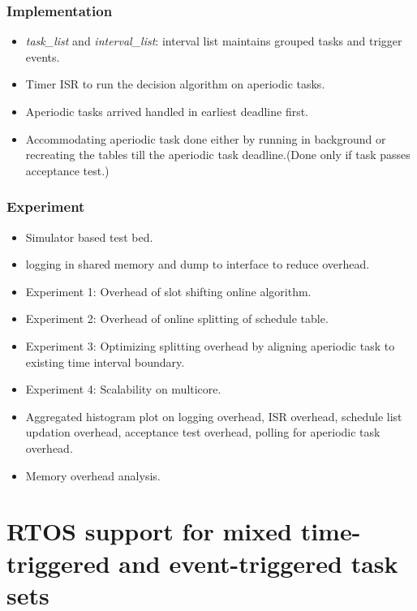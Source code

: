 \subsubsection*{Implementation}
\begin{itemize}
	\item \textit{task\_list} and \textit{interval\_list}: interval list maintains grouped tasks and trigger events.
	\item Timer ISR to run the decision algorithm on aperiodic tasks.
	\item Aperiodic tasks arrived handled in earliest deadline first.
	\item Accommodating aperiodic task done either by running in background or recreating the tables till the aperiodic task deadline.(Done only if task passes acceptance test.)	
\end{itemize}
\subsubsection*{Experiment}
\begin{itemize}
	\item Simulator based test bed.
	\item logging in shared memory and dump to interface to reduce overhead.
	\item Experiment 1: Overhead of slot shifting online algorithm.
	\item Experiment 2: Overhead of online splitting of schedule table.
	\item Experiment 3: Optimizing splitting overhead by aligning aperiodic task to existing time interval boundary.
	\item Experiment 4: Scalability on multicore.
	\item Aggregated histogram plot on logging overhead, ISR overhead, schedule list updation overhead, acceptance test overhead, polling for aperiodic task overhead.
	\item Memory overhead analysis.
\end{itemize}

\section{RTOS support for mixed time-triggered and event-triggered task sets}
